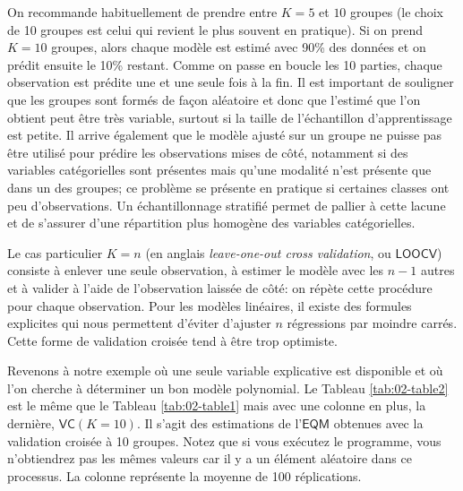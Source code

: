 \documentclass[
  11pt,
  letterpaper,
]{book}
\theoremstyle{definition}
\theoremstyle{definition}
\theoremstyle{definition}
\theoremstyle{definition}
\theoremstyle{remark}
\begin{document}
On recommande habituellement de prendre entre \(K=5\) et \(10\) groupes (le choix de 10 groupes est celui qui revient le plus souvent en pratique). Si on prend \(K=10\) groupes, alors chaque modèle est estimé avec 90\% des données et on prédit ensuite le 10\% restant. Comme on passe en boucle les 10 parties, chaque observation est prédite une et une seule fois à la fin. Il est important de souligner que les groupes sont formés de façon aléatoire et donc que l'estimé que l'on obtient peut être très variable, surtout si la taille de l'échantillon d'apprentissage est petite. Il arrive également que le modèle ajusté sur un groupe ne puisse pas être utilisé pour prédire les observations mises de côté, notamment si des variables catégorielles sont présentes mais qu'une modalité n'est présente que dans un des groupes; ce problème se présente en pratique si certaines classes ont peu d'observations. Un échantillonnage stratifié permet de pallier à cette lacune et de s'assurer d'une répartition plus homogène des variables catégorielles.

Le cas particulier \(K=n\) (en anglais \emph{leave-one-out cross validation}, ou \(\mathsf{LOOCV}\)) consiste à enlever une seule observation, à estimer le modèle avec les \(n-1\) autres et à valider à l'aide de l'observation laissée de côté: on répète cette procédure pour chaque observation. Pour les modèles linéaires, il existe des formules explicites qui nous permettent d'éviter d'ajuster \(n\) régressions par moindre carrés. Cette forme de validation croisée tend à être trop optimiste.

Revenons à notre exemple où une seule variable explicative est disponible et où l'on cherche à déterminer un bon modèle polynomial. Le Tableau \ref{tab:02-table2} est le même que le Tableau \ref{tab:02-table1} mais avec une colonne en plus, la dernière, \(\mathsf{VC} (K=10)\). Il s'agit des estimations de l'\(\mathsf{EQM}\) obtenues avec la validation croisée à 10 groupes. Notez que si vous exécutez le programme, vous n'obtiendrez pas les mêmes valeurs car il y a un élément aléatoire dans ce processus. La colonne représente la moyenne de 100 réplications.
\end{document}

